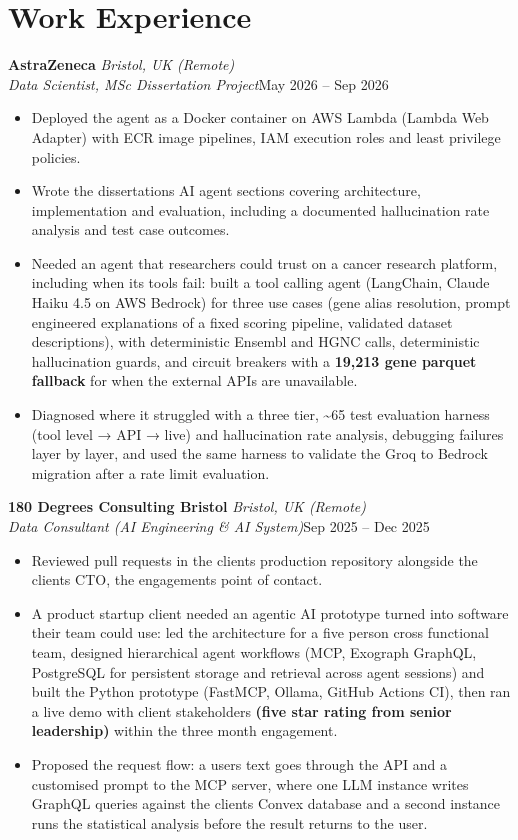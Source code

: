 \documentclass[a4paper,11pt]{article}
\newcommand{\role}[4]{%
  \textbf{#1}{\color{muted}\,\textperiodcentered\,\textit{#2}}\\
  \textit{#4}\hfill{\color{muted}#3}\par}
\newcommand{\gap}{\vspace{5pt}}
\newcommand{\num}[1]{\textbf{#1}}   %
\begin{document}
\section{Work Experience}
\role{AstraZeneca}{Bristol, UK (Remote)}{May 2026 – Sep 2026}{Data Scientist, MSc Dissertation Project}
\begin{itemize}
  \item Deployed the agent as a Docker container on AWS Lambda (Lambda Web Adapter) with ECR image pipelines, IAM execution roles and least privilege policies.
  \item Wrote the dissertation\textquotesingle{}s AI agent sections covering architecture, implementation and evaluation, including a documented hallucination rate analysis and test case outcomes.
  \item Needed an agent that researchers could trust on a cancer research platform, including when its tools fail: built a tool calling agent (LangChain, Claude Haiku 4.5 on AWS Bedrock) for three use cases (gene alias resolution, prompt engineered explanations of a fixed scoring pipeline, validated dataset descriptions), with deterministic Ensembl and HGNC calls, deterministic hallucination guards, and circuit breakers with a \num{19,213 gene parquet fallback} for when the external APIs are unavailable.
  \item Diagnosed where it struggled with a three tier, \textasciitilde{}65 test evaluation harness (tool level → API → live) and hallucination rate analysis, debugging failures layer by layer, and used the same harness to validate the Groq to Bedrock migration after a rate limit evaluation.
\end{itemize}
\gap
{}
\role{180 Degrees Consulting Bristol}{Bristol, UK (Remote)}{Sep 2025 – Dec 2025}{Data Consultant (AI Engineering \& AI System)}
\begin{itemize}
  \item Reviewed pull requests in the client\textquotesingle{}s production repository alongside the client\textquotesingle{}s CTO, the engagement\textquotesingle{}s point of contact.
  \item A product startup client needed an agentic AI prototype turned into software their team could use: led the architecture for a five person cross functional team, designed hierarchical agent workflows (MCP, Exograph GraphQL, PostgreSQL for persistent storage and retrieval across agent sessions) and built the Python prototype (FastMCP, Ollama, GitHub Actions CI), then ran a live demo with client stakeholders \num{(five star rating from senior leadership)} within the three month engagement.
  \item Proposed the request flow: a user\textquotesingle{}s text goes through the API and a customised prompt to the MCP server, where one LLM instance writes GraphQL queries against the client\textquotesingle{}s Convex database and a second instance runs the statistical analysis before the result returns to the user.
\end{itemize}
\end{document}
